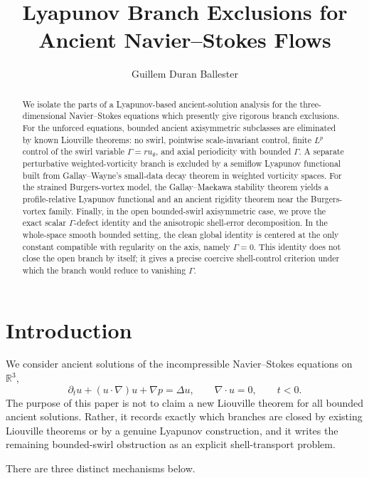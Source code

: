 \documentclass[11pt]{amsart}
\title[Lyapunov branch exclusions for ancient Navier--Stokes flows]
{Lyapunov Branch Exclusions for Ancient Navier--Stokes Flows}
\author{Guillem Duran Ballester}
\date{}
\theoremstyle{plain}
\theoremstyle{definition}
\theoremstyle{remark}
\numberwithin{equation}{section}
\begin{document}
\begin{abstract}
We isolate the parts of a Lyapunov-based ancient-solution analysis for the
three-dimensional Navier--Stokes equations which presently give rigorous
branch exclusions.  For the unforced equations, bounded ancient axisymmetric
subclasses are eliminated by known Liouville theorems: no swirl, pointwise
scale-invariant control, finite \(L^p\) control of the swirl variable
\(\Gamma=ru_\theta\), and axial periodicity with bounded \(\Gamma\).  A
separate perturbative weighted-vorticity branch is excluded by a semiflow
Lyapunov functional built from Gallay--Wayne's small-data decay theorem in weighted
vorticity spaces.  For the strained Burgers-vortex model, the
Gallay--Maekawa stability theorem yields a profile-relative Lyapunov functional
and an ancient rigidity theorem near the Burgers-vortex family.  Finally, in
the open bounded-swirl axisymmetric case, we prove the exact scalar
\(\Gamma\)-defect identity and the anisotropic shell-error decomposition.  In
the whole-space smooth bounded setting, the clean global identity is centered
at the only constant compatible with regularity on the axis, namely
\(\Gamma=0\).  This identity does not close the open branch by itself; it gives
a precise coercive shell-control criterion under which the branch would reduce
to vanishing \(\Gamma\).
\end{abstract}

\maketitle

\section{Introduction}

We consider ancient solutions of the incompressible Navier--Stokes equations
on \(\mathbb R^3\),
\begin{equation}\label{eq:ns}
   \partial_t u+(u\cdot\nabla)u+\nabla p=\Delta u,\qquad
   \nabla\cdot u=0,
   \qquad t<0.
\end{equation}
The purpose of this paper is not to claim a new Liouville theorem for all
bounded ancient solutions.  Rather, it records exactly which branches are
closed by existing Liouville theorems or by a genuine Lyapunov construction,
and it writes the remaining bounded-swirl obstruction as an explicit
shell-transport problem.

There are three distinct mechanisms below.
\end{document}
